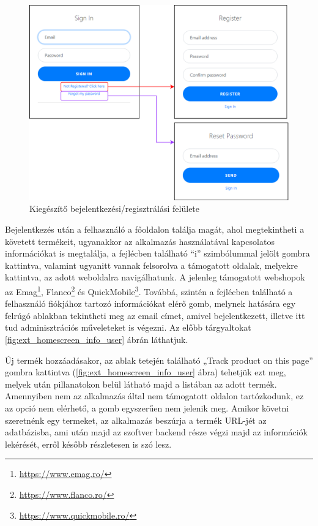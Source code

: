 \begin{figure}[H]
    \centering
    \includegraphics[scale=0.9]{figures/images/login-reg-ext.png}
    \caption{Kiegészítő bejelentkezési/regisztrálási felülete}
    \label{fig:ext_login_reg}
\end{figure}

Bejelentkezés után a felhasználó a főoldalon találja magát, ahol megtekintheti a követett termékeit, ugyanakkor az alkalmazás használatával kapcsolatos információkat is megtalálja, a fejlécben található “i” szimbólummal jelölt gombra kattintva, valamint ugyanitt vannak felsorolva a támogatott oldalak, melyekre kattintva, az adott weboldalra navigálhatunk. A jelenleg támogatott webshopok az Emag\footnote{\url{https://www.emag.ro/}}, Flanco\footnote{\url{https://www.flanco.ro/}} és QuickMobile\footnote{\url{https://www.quickmobile.ro/}}. Továbbá, szintén a fejlécben található a felhasználó fiókjához tartozó információkat elérő gomb, melynek hatására egy felrúgó ablakban tekintheti meg az email címet, amivel bejelentkezett, illetve itt tud adminisztrációs műveleteket is végezni. Az előbb tárgyaltokat \ref{fig:ext_homescreen_info_user} ábrán láthatjuk.

Új termék hozzáadásakor, az ablak tetején található „Track product on this page” gombra kattintva (\ref{fig:ext_homescreen_info_user} ábra) tehetjük ezt meg, melyek után pillanatokon belül látható majd a listában az adott termék. Amennyiben nem az alkalmazás által nem támogatott oldalon tartózkodunk, ez az opció nem elérhető, a gomb egyszerűen nem jelenik meg. Amikor követni szeretnénk egy termeket, az alkalmazás beszúrja a termék URL-jét az adatbázisba, ami után majd az szoftver backend része végzi majd az információk lekérését, erről később részletesen is szó lesz.

